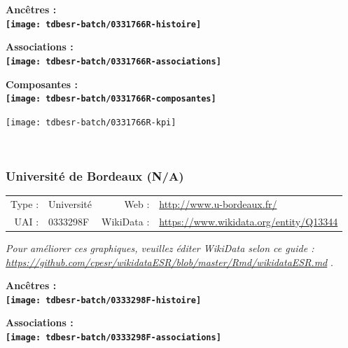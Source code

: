 \documentclass[12pt,french,]{article}
\begin{document}
\vspace{1cm}  
\begin{minipage}[b]{0.50\textwidth}\begin{center} \bf Ancêtres : \\  
\texttt{[image: tdbesr-batch/0331766R-histoire]} \end{center}\end{minipage}\begin{minipage}[b]{0.50\textwidth}\begin{center} \bf Associations : \\  
\texttt{[image: tdbesr-batch/0331766R-associations]} \end{center}\end{minipage}

\hrulefill

\begin{center} \bf Composantes : \\  
\texttt{[image: tdbesr-batch/0331766R-composantes]} \end{center}

\begin{center}\texttt{[image: tdbesr-batch/0331766R-kpi]} \end{center}\checkoddpage

\ifoddpage \fi ~\newpage  

\hypertarget{universituxe9-de-bordeaux-na}{%
\subsubsection{Université de Bordeaux
(N/A)}\label{universituxe9-de-bordeaux-na}}

\begin{tabular*}{\textwidth}{rp{5cm}rl}  
\hline  
Type : & Université & Web : &\href{http://www.u-bordeaux.fr/}{http://www.u-bordeaux.fr/} \\  
UAI : & 0333298F & WikiData : & \href{https://www.wikidata.org/entity/Q13344}{https://www.wikidata.org/entity/Q13344} \\  
\hline  
\end{tabular*}

\textit{\scriptsize Pour améliorer ces graphiques, veuillez éditer WikiData selon ce guide :  \href{https://github.com/cpesr/wikidataESR/blob/master/Rmd/wikidataESR.md}{https://github.com/cpesr/wikidataESR/blob/master/Rmd/wikidataESR.md}}
.

\vspace{1cm}  
\begin{minipage}[b]{0.50\textwidth}\begin{center} \bf Ancêtres : \\  
\texttt{[image: tdbesr-batch/0333298F-histoire]} \end{center}\end{minipage}\begin{minipage}[b]{0.50\textwidth}\begin{center} \bf Associations : \\  
\texttt{[image: tdbesr-batch/0333298F-associations]} \end{center}\end{minipage}
\end{document}
